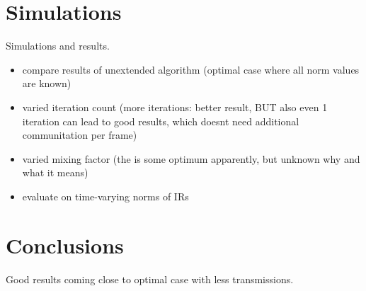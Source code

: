 \documentclass{article}
\begin{document}
\section{Simulations}
\label{sec:simulations}
Simulations and results.
\begin{itemize}
  \item compare results of unextended algorithm (optimal case where all norm values are known)
  \item varied iteration count (more iterations: better result, BUT also even 1 iteration can lead to good results, which doesnt need additional communitation per frame)
  \item varied mixing factor (the is some optimum apparently, but unknown why and what it means)
  \item evaluate on time-varying norms of IRs
\end{itemize}

\section[]{Conclusions}
\label{sec:conclusions}
Good results coming close to optimal case with less transmissions.



\vfill\pagebreak



\end{document}
